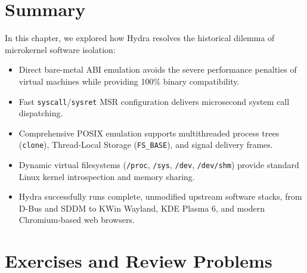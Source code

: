 \section{Summary}
\label{sec:summary_chap7}

In this chapter, we explored how Hydra resolves the historical dilemma of microkernel software isolation:
\begin{itemize}
    \item Direct bare-metal ABI emulation avoids the severe performance penalties of virtual machines while providing 100\% binary compatibility.
    \item Fast \texttt{syscall}/\texttt{sysret} MSR configuration delivers microsecond system call dispatching.
    \item Comprehensive POSIX emulation supports multithreaded process trees (\texttt{clone}), Thread-Local Storage (\texttt{FS\_BASE}), and signal delivery frames.
    \item Dynamic virtual filesystems (\texttt{/proc}, \texttt{/sys}, \texttt{/dev}, \texttt{/dev/shm}) provide standard Linux kernel introspection and memory sharing.
    \item Hydra successfully runs complete, unmodified upstream software stacks, from D-Bus and SDDM to KWin Wayland, KDE Plasma 6, and modern Chromium-based web browsers.
\end{itemize}

\section{Exercises and Review Problems}
\label{sec:exercises_chap7}

